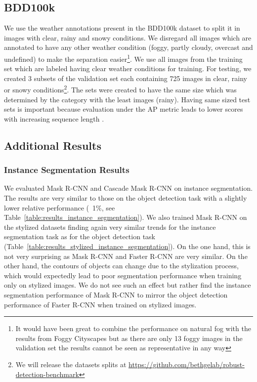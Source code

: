 \documentclass{article}
\begin{document}
\subsection{BDD100k}
\label{appendix:natural_distortions}
We use the weather annotations present in the BDD100k dataset \cite{yu2018bdd100k} to split it in images with clear, rainy and snowy conditions. We disregard all images which are annotated to have any other weather condition (foggy, partly cloudy, overcast and undefined) to make the separation easier\footnote{It would have been great to combine the performance on natural fog with the results from Foggy Cityscapes but as there are only 13 foggy images in the validation set the results cannot be seen as representative in any way}.  We use all images from the training set which are labeled having clear weather conditions for training. For testing, we created 3 subsets of the validation set each containing 725 images in clear, rainy or snowy conditions\footnote{We will release the datasets splits at \url{https://github.com/bethgelab/robust-detection-benchmark}}. The sets were created to have the same size which was determined by the category with the least images (rainy). Having same sized test sets is important because evaluation under the AP metric leads to lower scores with increasing sequence length \citep{gupta2019lvis}.

\subsection{Additional Results}
\label{appendix:results}

\subsubsection{Instance Segmentation Results}

We evaluated Mask R-CNN and Cascade Mask R-CNN on instance segmentation. The results are very similar to those on the object detection task with a slightly lower relative performance (~1\%, see Table~\ref{table:results_instance_segmentation}). We also trained Mask R-CNN on the stylized datasets finding again very similar trends for the instance segmentation task as for the object detection task (Table~\ref{table:results_stylized_instance_segmentation}).
On the one hand, this is not very surprising as Mask R-CNN and Faster R-CNN are very similar. On the other hand, the contours of objects can change due to the stylization process, which would expectedly lead to poor segmentation performance when training only on stylized images. We do not see such an effect but rather find the instance segmentation performance of Mask R-CNN to mirror the object detection performance of Faster R-CNN when trained on stylized images.
\end{document}
